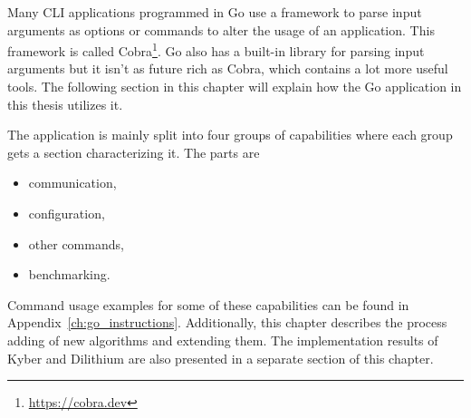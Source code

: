 Many CLI applications programmed in Go use a framework to parse input arguments as options or commands to alter the usage of an application. This framework is called Cobra\footnote{\url{https://cobra.dev}}. Go also has a built-in library for parsing input arguments but it isn't as future rich as Cobra, which contains a lot more useful tools. The following section in this chapter will explain how the Go application in this thesis utilizes it.

The application is mainly split into four groups of capabilities where each group gets a section characterizing it. The parts are
\begin{itemize}
  \item communication,
  \item configuration,
  \item other commands,
  \item benchmarking.
\end{itemize}
\noindent Command usage examples for some of these capabilities can be found in Appendix~\ref{ch:go_instructions}. Additionally, this chapter describes the process adding of new algorithms and extending them. The implementation results of Kyber and Dilithium are also presented in a separate section of this chapter.

